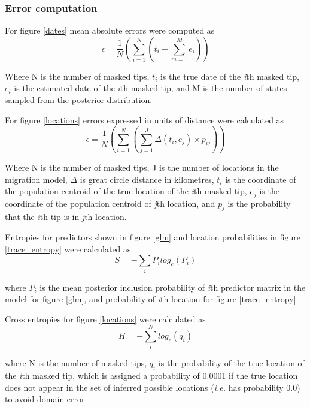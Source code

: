 \documentclass[11pt,oneside,letterpaper]{article}
\begin{document}
\subsubsection*{Error computation}
For figure \ref{dates} mean absolute errors were computed as
\begin{equation}
    \epsilon = \frac{1}{N} (\sum_{i=1}^{N} (t_{i} - \sum_{m=1}^{M} e_{i}))
\end{equation}

Where N is the number of masked tips, $t_{i}$ is the true date of the \textit{i}th masked tip, $e_{i}$ is the estimated date of the \textit{i}th masked tip, and M is the number of states  sampled from the posterior distribution.

For figure \ref{locations} errors expressed in units of distance were calculated as
\begin{equation}
  \epsilon = \frac{1}{N} (\sum_{i=1}^{N} (\sum_{j=1}^{J} \Delta(t_{i},e_{j})\times p_{ij}))
\end{equation}

Where N is the number of masked tips, J is the number of locations in the migration model, $\Delta$ is great circle distance in kilometres, $t_{i}$ is the coordinate of the population centroid of the true location of the \textit{i}th masked tip, $e_{j}$ is the coordinate of the population centroid of \textit{j}th location, and $p_{j}$ is the probability that the \textit{i}th tip is in \textit{j}th location.

Entropies for predictors shown in figure \ref{glm} and location probabilities in figure \ref{trace_entropy} were calculated as
\begin{equation}
  S = -\sum_{i} P_{i} log_{e}(P_{i})
\end{equation}

where $P_{i}$ is the mean posterior inclusion probability of \textit{i}th predictor matrix in the model for figure \ref{glm}, and probability of \textit{i}th location for figure \ref{trace_entropy}.

Cross entropies for figure \ref{locations} were calculated as
\begin{equation}
  H = -\sum_{i}^{N} log_{e}(q_{i})
\end{equation}

where N is the number of masked tips, $q_{i}$ is the probability of the true location of the \textit{i}th masked tip, which is assigned a probability of 0.0001 if the true location does not appear in the set of inferred possible locations (\textit{i.e.} has probability 0.0) to avoid domain error.
\end{document}
